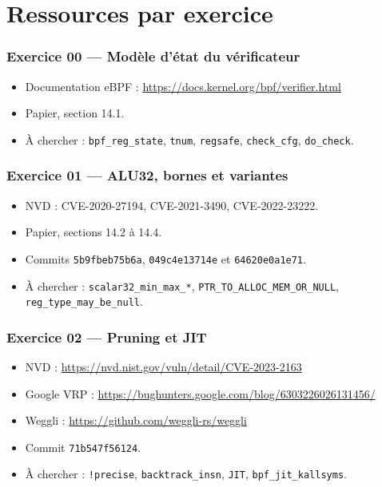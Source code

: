 \documentclass{training}
\begin{document}
\chapter{Ressources par exercice}

\subsection*{Exercice 00 --- Modèle d'état du vérificateur}
\begin{itemize}
  \item Documentation eBPF :
        \url{https://docs.kernel.org/bpf/verifier.html}
  \item Papier, section 14.1.
  \item À chercher : \texttt{bpf\_reg\_state}, \texttt{tnum},
        \texttt{regsafe}, \texttt{check\_cfg}, \texttt{do\_check}.
\end{itemize}

\subsection*{Exercice 01 --- ALU32, bornes et variantes}
\begin{itemize}
  \item NVD : CVE-2020-27194, CVE-2021-3490, CVE-2022-23222.
  \item Papier, sections 14.2 à 14.4.
  \item Commits \texttt{5b9fbeb75b6a}, \texttt{049c4e13714e} et
        \texttt{64620e0a1e71}.
  \item À chercher : \texttt{scalar32\_min\_max\_*},
        \texttt{PTR\_TO\_ALLOC\_MEM\_OR\_NULL}, \texttt{reg\_type\_may\_be\_null}.
\end{itemize}

\subsection*{Exercice 02 --- Pruning et JIT}
\begin{itemize}
  \item NVD : \url{https://nvd.nist.gov/vuln/detail/CVE-2023-2163}
  \item Google VRP :
        \url{https://bughunters.google.com/blog/6303226026131456/}
  \item Weggli : \url{https://github.com/weggli-rs/weggli}
  \item Commit \texttt{71b547f56124}.
  \item À chercher : \texttt{!precise}, \texttt{backtrack\_insn},
        \texttt{JIT}, \texttt{bpf\_jit\_kallsyms}.
\end{itemize}
\end{document}
